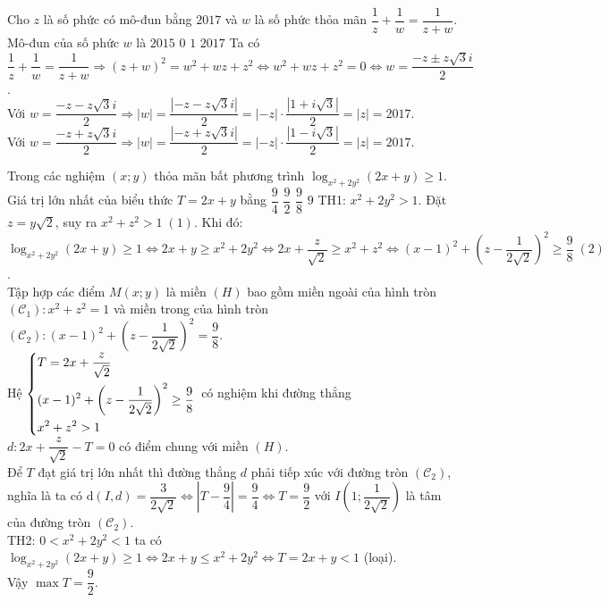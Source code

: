 \begin{ex}%
Cho $z$ là số phức có mô-đun bằng $2017$ và $w$ là số phức thỏa mãn $\dfrac{1}{z}+\dfrac{1}{w}=\dfrac{1}{z+w}$. Mô-đun của số phức $w$ là
\choice
{$2015$}
{$0$}
{$1$}
{\True $2017$}
\loigiai
{Ta có $\dfrac{1}{z}+\dfrac{1}{w}=\dfrac{1}{z+w}\Rightarrow (z+w)^2=w^2+wz+z^2\Leftrightarrow w^2+wz+z^2=0\Leftrightarrow w=\dfrac{-z\pm z\sqrt{3}i}{2}$.\\Với $w=\dfrac{-z-z\sqrt{3}i}{2}\Rightarrow |w|=\dfrac{\left|-z-z\sqrt{3}i\right|}{2}=|-z|\cdot \dfrac{\left|1+i\sqrt{3}\right|}{2}=|z|=2017$.\\Với $w=\dfrac{-z+z\sqrt{3}i}{2}\Rightarrow |w|=\dfrac{\left|-z+z\sqrt{3}i\right|}{2}=|-z|\cdot \dfrac{\left|1-i\sqrt{3}\right|}{2}=|z|=2017$.}
\end{ex}

\begin{ex}%
Trong các nghiệm $(x;y)$ thỏa mãn bất phương trình $\log_{x^2+2y^2}(2x+y)\geq 1$. Giá trị lớn nhất của biểu thức $T=2x+y$ bằng
\choice
{$\dfrac{9}{4}$}
{\True $\dfrac{9}{2}$}
{$\dfrac{9}{8}$}
{$9$}
\loigiai
{TH1: $x^2+2y^2>1$. Đặt $z=y\sqrt{2}$, suy ra $x^2+z^2>1\;(1)$. Khi đó:\\ $\log_{x^2+2y^2}(2x+y)\geq 1\Leftrightarrow 2x+y\geq x^2+2y^2\Leftrightarrow 2x+\dfrac{z}{\sqrt{2}}\geq x^2+z^2\Leftrightarrow (x-1)^2+\left(z-\dfrac{1}{2\sqrt{2}}\right)^2\geq\dfrac{9}{8}\;(2)$.\\Tập hợp các điểm $M(x;y)$ là miền $(H)$ bao gồm miền ngoài của hình tròn $\left(\mathscr{C}_1\right): x^2+z^2=1$ và miền trong của hình tròn $\left(\mathscr{C}_2\right): (x-1)^2+\left(z-\dfrac{1}{2\sqrt{2}}\right)^2=\dfrac{9}{8}$.\\Hệ $\left\{\begin{aligned}&T=2x+\dfrac{z}{\sqrt{2}}\\&(x-1)^2+\left(z-\dfrac{1}{2\sqrt{2}}\right)^2\geq\dfrac{9}{8}\\&x^2+z^2>1\end{aligned}\right.$ có nghiệm khi đường thẳng $d: 2x+\dfrac{z}{\sqrt{2}}-T=0$ có điểm chung với miền $(H)$.\\Để $T$ đạt giá trị lớn nhất thì đường thẳng $d$ phải tiếp xúc với đường tròn $(\mathscr{C}_2)$, nghĩa là ta có $\mathrm{d}(I,d)=\dfrac{3}{2\sqrt{2}}\Leftrightarrow\left|T-\dfrac{9}{4}\right|=\dfrac{9}{4}\Leftrightarrow T=\dfrac{9}{2}$ với $I\left(1;\dfrac{1}{2\sqrt{2}}\right)$ là tâm của đường tròn $(\mathscr{C}_2)$.\\TH2: $0<x^2+2y^2<1$ ta có\\ $\log_{x^2+2y^2}(2x+y)\geq 1\Leftrightarrow 2x+y\leq x^2+2y^2\Leftrightarrow T=2x+y<1$ (loại).\\
Vậy $\max T=\dfrac{9}{2}$.
}
\end{ex}

